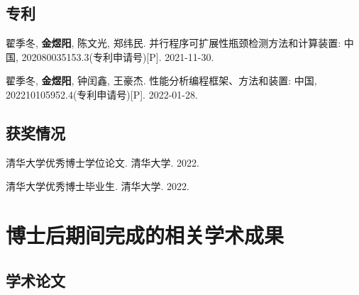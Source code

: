 \begin{resume}
  \subsection*{专利}

  \begin{achievements}
    \item 翟季冬, \textbf{金煜阳}, 陈文光, 郑纬民. 并行程序可扩展性瓶颈检测方法和计算装置: 中国, 202080035153.3(专利申请号)[P]. 2021-11-30.
    \item 翟季冬, \textbf{金煜阳}, 钟闰鑫, 王豪杰. 性能分析编程框架、方法和装置: 中国, 202210105952.4(专利申请号)[P]. 2022-01-28.
  \end{achievements}

  \subsection*{获奖情况}

  \begin{achievements}
    \item 清华大学优秀博士学位论文. 清华大学. 2022.
    \item 清华大学优秀博士毕业生. 清华大学. 2022.
  \end{achievements}

  \section*{博士后期间完成的相关学术成果}

  \subsection*{学术论文}


\end{resume}
